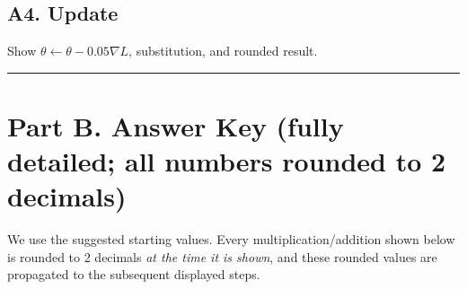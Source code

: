 \documentclass[11pt]{article}
\begin{document}
\subsection*{A4. Update}
Show $\theta\leftarrow\theta-0.05\nabla L$, substitution, and rounded result.

\bigskip\hrule\bigskip

\section*{Part B. Answer Key (fully detailed; all numbers rounded to 2 decimals)}
We use the suggested starting values. Every multiplication/addition shown below is rounded to 2 decimals \emph{at the time it is shown}, and these rounded values are propagated to the subsequent displayed steps.\bigskip
\end{document}
